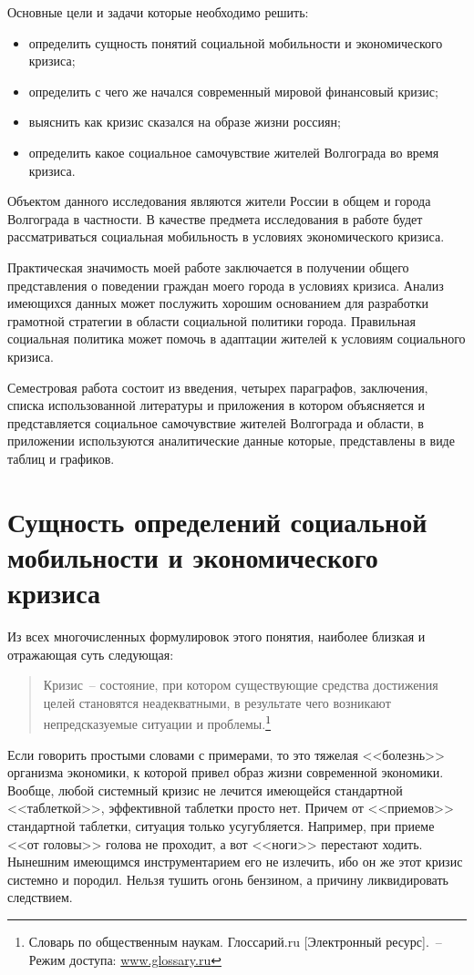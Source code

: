   Основные цели и задачи которые необходимо решить:
  \begin{itemize}
    \itemsep -.75ex
    \item определить сущность понятий социальной мобильности и экономического
      кризиса;
    \item определить с чего же начался современный мировой финансовый кризис;
    \item выяснить как кризис сказался на образе жизни россиян;
    \item определить какое социальное самочувствие жителей Волгограда во время
      кризиса.
  \end{itemize}

  Объектом данного исследования являются жители России в общем и города
  Волгограда в частности. В качестве предмета исследования в работе будет
  рассматриваться социальная мобильность в условиях экономического кризиса.

  Практическая значимость моей работе заключается в получении общего
  представления о поведении граждан моего города в условиях кризиса. Анализ
  имеющихся данных может послужить хорошим основанием для разработки грамотной
  стратегии в области социальной политики города. Правильная социальная политика
  может помочь в адаптации жителей к условиям социального кризиса.

  Семестровая работа состоит из введения, четырех параграфов, заключения, списка
  использованной литературы и приложения в котором объясняется и представляется
  социальное самочувствие жителей Волгограда и области, в приложении
  используются аналитические данные которые, представлены в виде таблиц и
  графиков.

  \section{Сущность определений социальной мобильности и экономического кризиса}

  Из всех многочисленных формулировок этого понятия, наиболее близкая и
  отражающая суть следующая:
  \begin{quote}
    Кризис~-- состояние, при котором существующие средства достижения целей
    становятся неадекватными, в результате чего возникают непредсказуемые
    ситуации и проблемы.\footnote{Словарь по общественным наукам.
    Глоссарий.ru [Электронный ресурс].~-- Режим доступа: \url{www.glossary.ru}}
  \end{quote}
  Если говорить простыми словами с примерами, то это тяжелая <<болезнь>>
  организма экономики, к которой привел образ жизни современной экономики.
  Вообще, любой системный кризис не лечится имеющейся стандартной <<таблеткой>>,
  эффективной таблетки просто нет. Причем от <<приемов>> стандартной таблетки,
  ситуация только усугубляется. Например, при приеме <<от головы>> голова не
  проходит, а вот <<ноги>> перестают ходить. Нынешним имеющимся инструментарием
  его не излечить, ибо он же этот кризис системно и породил. Нельзя тушить огонь
  бензином, а причину ликвидировать следствием.
  
